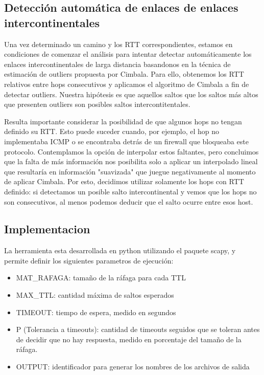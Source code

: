 \subsection{Detección automática de enlaces de enlaces intercontinentales}

Una vez determinado un camino y los RTT correspondientes, estamos en condiciones de comenzar el análisis para intentar detectar automáticamente los enlaces intercontinentales de larga distancia basandonos en la técnica de estimación de outliers propuesta por Cimbala. Para ello, obtenemos los RTT relativos entre hops consecutivos y aplicamos el algoritmo de Cimbala a fin de detectar outliers. Nuestra hipótesis es que aquellos saltos que los saltos más altos que presenten outliers son posibles saltos intercontitentales. 

Resulta importante  considerar la posibilidad de que algunos hops no tengan definido su RTT. Esto puede suceder cuando, por ejemplo, el hop no implementaba ICMP o se encontraba detrás de un firewall que bloqueaba este protocolo. Contemplamos la opción de interpolar estos faltantes, pero concluimos que la falta de más información nos posibilita solo a aplicar un interpolado lineal que resultaría en información "suavizada" que juegue negativamente al momento de aplicar Cimbala. Por esto, decidimos utilizar solamente los hops con RTT definido: si detectamos un posible salto intercontinental y vemos que los hops no son consecutivos, al menos podemos deducir que el salto ocurre entre esos host. 


\subsection{Implementacion}

La herramienta esta desarrollada en python utilizando el paquete scapy, y permite definir los siguientes parametros de ejecución:
\begin{itemize}
	\item{MAT\_RAFAGA: tamaño de la ráfaga para cada TTL}
	\item{MAX\_TTL: cantidad máxima de saltos esperados}
	\item{TIMEOUT: tiempo de espera, medido en segundos }
	\item{P (Tolerancia a timeouts): cantidad de timeouts seguidos que se toleran antes de decidir que no hay respuesta, medido en porcentaje del tamaño de la ráfaga.}
	\item{OUTPUT: identificador para generar los nombres de los archivos de salida}
\end{itemize}

